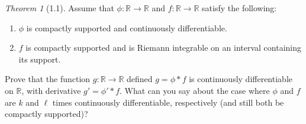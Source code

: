 \documentclass[12pt]{article}
\theoremstyle{remark}
\theoremstyle{named}
\newtheorem*{theorem}{Theorem}
\newcommand{\R}{\mathbb R}
\begin{document}
\begin{theorem}[1.1]
    Assume that \(\phi : \R \to \R\) and \(f : \R \to \R\) satisfy the following:
    \begin{enumerate}
        \item \(\phi\) is compactly supported and continuously differentiable.
        \item \(f\) is compactly supported and is Riemann integrable on an interval containing its support.
    \end{enumerate}
    Prove that the function \(g : \R \to \R\) defined \(g = \phi * f\) is continuously differentiable on \(\R\), with derivative \(g' = \phi' * f\). What can you say about the case where \(\phi\) and \(f\) are \(k\) and \(\ell\) times continuously differentiable, respectively (and still both be compactly supported)?
\end{theorem}
\end{document}
